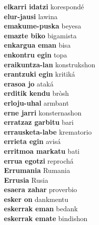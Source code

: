 \textbf{ elkarri idatzi  } korespondé \\
\textbf{ elur-jausi  } lawina \\
\textbf{ emakume-puska  } beyesa \\
\textbf{ emazte biko  } bigamista \\
\textbf{ enkargua eman  } bisa \\
\textbf{ enkontru egin  } topa \\
\textbf{ eraikuntza-lan  } konstrukshon \\
\textbf{ erantzuki egin  } kritiká \\
\textbf{ erasoa jo  } ataká \\
\textbf{ erditik kendu  } bròsh \\
\textbf{ erloju-uhal  } armbant \\
\textbf{ erne jarri  } konsternashon \\
\textbf{ erratzaz garbitu  } bari \\
\textbf{ errausketa-labe  } krematorio \\
\textbf{ errieta egin  } avisá \\
\textbf{ erritmoa markatu  } bati \\
\textbf{ errua egotzi  } reprochá \\
\textbf{ Errumania  } Rumania \\
\textbf{ Errusia  } Rusia \\
\textbf{ esaera zahar  } proverbio \\
\textbf{ esker on  } dankmentu \\
\textbf{ eskerrak eman  } bedank \\
\textbf{ eskerrak emate  } bindishon \\
